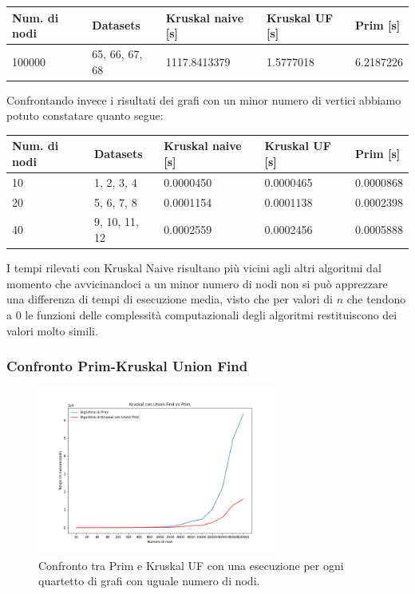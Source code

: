 \begin{table}[H]\centering
	\begin{tabular}{l|l|l|l|l}
        \textbf{Num. di nodi} & \textbf{Datasets} & \textbf{Kruskal naive [s]} & \textbf{Kruskal UF [s]} & \textbf{Prim [s]} \\
    \hline
	100000 & 65, 66, 67, 68 & 1117.8413379  & 1.5777018  & 6.2187226 
	\end{tabular}
\end{table}

Confrontando invece i risultati dei grafi con un minor numero di vertici abbiamo potuto constatare quanto segue:

\begin{table}[H]\centering
	\begin{tabular}{l|l|l|l|l}
        \textbf{Num. di nodi} & \textbf{Datasets} & \textbf{Kruskal naive [s]} & \textbf{Kruskal UF [s]} & \textbf{Prim [s]} \\
    \hline
	10 & 1, 2, 3, 4  & 0.0000450 & 0.0000465 & 0.0000868 \\
    20 & 5, 6, 7, 8  & 0.0001154 & 0.0001138  & 0.0002398 \\
    40 & 9, 10, 11, 12  & 0.0002559 & 0.0002456  & 0.0005888 \\
	\end{tabular}
\end{table}

\noindent I tempi rilevati con Kruskal Naive risultano più vicini agli altri algoritmi dal momento che avvicinandoci a un minor numero di nodi non si può apprezzare una differenza di tempi di esecuzione media, visto che per valori di \(n\) che tendono a 0 le funzioni delle complessità computazionali degli algoritmi restituiscono dei valori molto simili. 

\subsubsection{Confronto Prim-Kruskal Union Find}


\begin{figure}[H]
	\centering
	\includegraphics[width=0.7\textwidth]{res/images/graph-no-rep/kruskal_uf_vs_prim_senza_ripetizioni.png}
    \caption{Confronto tra Prim e Kruskal UF con una esecuzione per ogni quartetto di grafi con uguale numero di nodi.}
	\label{fig:krukal_vs_primnr}
\end{figure}


